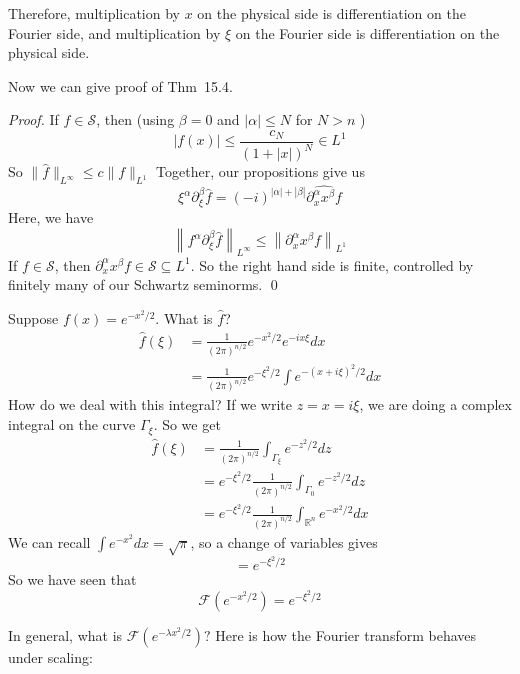 Therefore, multiplication by $x$ on the physical side is differentiation on the Fourier side, and multiplication by $\xi$ on the Fourier side is differentiation on the physical side.

Now we can give proof of Thm~15.4.
\vspace{1em}
\begin{proof}
    If $f \in \mathcal{S}$, then (using $\beta=0$ and $|\alpha| \leq N$ for $N>n$ )
$$
|f(x)| \leq \frac{c_{N}}{(1+|x|)^{N}} \in L^{1}
$$
So $\|\widehat{f}\|_{L^{\infty}} \leq c\|f\|_{L^{1}}$
Together, our propositions give us
$$
\xi^{\alpha} \partial_{\xi}^{\beta} \widehat{f}=(-i)^{|\alpha|+|\beta|} \widehat{\partial_{x}^{\alpha} x^{\beta} f}
$$
Here, we have
$$
\left\|f^{\alpha} \partial_{\xi}^{\beta} \widehat{f}\right\|_{L^{\infty}} \leq\left\|\partial_{x}^{\alpha} x^{\beta} f\right\|_{L^{1}}
$$
If $f \in \mathcal{S}$, then $\partial_{x}^{\alpha} x^{\beta} f \in \mathcal{S} \subseteq L^{1} .$ So the right hand side is finite, controlled by finitely many of our Schwartz seminorms.
\qed 
\end{proof}

\begin{example}
 Suppose $f(x) = e^{-x^2/2}$. What is $\hat f$?
\[
    \begin{aligned}
        \widehat{f}(\xi) &=\frac{1}{(2 \pi)^{n / 2}} e^{-x^{2} / 2} e^{-i x \xi} d x \\
        &=\frac{1}{(2 \pi)^{n / 2}} e^{-\xi^{2} / 2} \int e^{-(x+i \xi)^{2} / 2} d x
        \end{aligned}
\]
How do we deal with this integral? If we write $z=x=i \xi$, we are doing a complex integral on the curve $\Gamma_{\xi}$. So we get 
\[
    \begin{aligned}
        \widehat{f}(\xi) &=\frac{1}{(2 \pi)^{n / 2}} \int_{\Gamma_{\xi}} e^{-z^{2} / 2} d z \\
        &=e^{-\xi^{2} / 2} \frac{1}{(2 \pi)^{n / 2}} \int_{\Gamma_{0}} e^{-z^{2} / 2} d z \\
        &=e^{-\xi^{2} / 2} \frac{1}{(2 \pi)^{n / 2}} \int_{\mathbb{R}^{n}} e^{-x^{2} / 2} d x
        \end{aligned}
\]
We can recall $\int e^{-x^{2}} d x=\sqrt{\pi}$, so a change of variables gives
$$
=e^{-\xi^{2} / 2}
$$
So we have seen that
$$
\mathcal{F}\left(e^{-x^{2} / 2}\right)=e^{-\xi^{2} / 2}
$$
\end{example}

In general, what is $\mathcal{F}\left(e^{-\lambda x^{2} / 2}\right) ?$ Here is how the Fourier transform behaves under scaling:

